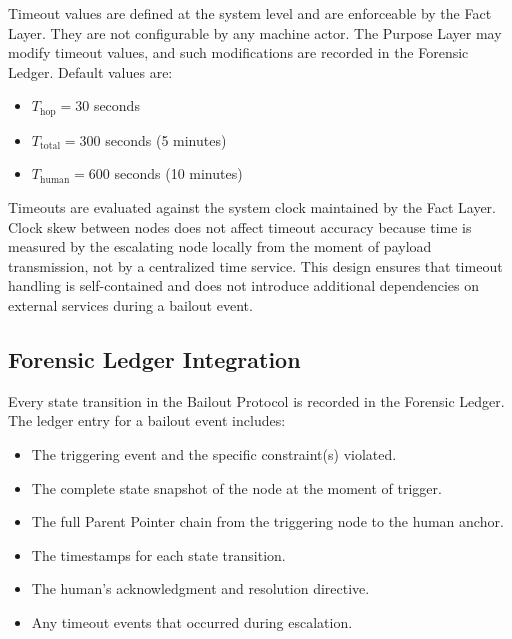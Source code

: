 \begin{definition}
\label{def:timeout-config}
Timeout values are defined at the system level and are enforceable by the Fact Layer. They are not configurable by any machine actor. The Purpose Layer may modify timeout values, and such modifications are recorded in the Forensic Ledger. Default values are:

\begin{itemize}
    \item $T_{\text{hop}} = 30$ seconds
    \item $T_{\text{total}} = 300$ seconds (5 minutes)
    \item $T_{\text{human}} = 600$ seconds (10 minutes)
\end{itemize}
\end{definition}

Timeouts are evaluated against the system clock maintained by the Fact Layer. Clock skew between nodes does not affect timeout accuracy because time is measured by the escalating node locally from the moment of payload transmission, not by a centralized time service. This design ensures that timeout handling is self-contained and does not introduce additional dependencies on external services during a bailout event.

\subsection{Forensic Ledger Integration}
\label{sec:forensic-ledger-integration}

Every state transition in the Bailout Protocol is recorded in the Forensic Ledger. The ledger entry for a bailout event includes:

\begin{itemize}
    \item The triggering event and the specific constraint(s) violated.
    \item The complete state snapshot of the node at the moment of trigger.
    \item The full Parent Pointer chain from the triggering node to the human anchor.
    \item The timestamps for each state transition.
    \item The human's acknowledgment and resolution directive.
    \item Any timeout events that occurred during escalation.
\end{itemize}

